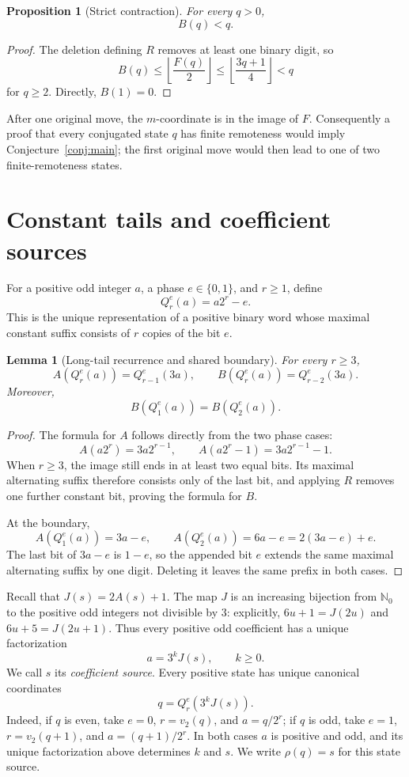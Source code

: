 \documentclass[11pt,a4paper]{article}
\newtheorem{proposition}[theorem]{Proposition}
\newtheorem{lemma}[theorem]{Lemma}
\theoremstyle{definition}
\theoremstyle{remark}
\newcommand{\Natz}{\mathbb N_0}
\begin{document}
\begin{proposition}[Strict contraction]\label{prop:B-contracts}
For every $q>0$,
\[
  B(q)<q.
\]
\end{proposition}

\begin{proof}
The deletion defining $R$ removes at least one binary digit, so
\[
 B(q)\le \left\lfloor\frac{F(q)}2\right\rfloor
 \le \left\lfloor\frac{3q+1}{4}\right\rfloor<q
\]
for $q\ge2$.  Directly, $B(1)=0$.
\end{proof}

After one original move, the $m$-coordinate is in the image of $F$.
Consequently a proof that every conjugated state $q$ has finite remoteness
would imply Conjecture~\ref{conj:main}; the first original move would then
lead to one of two finite-remoteness states.

\section{Constant tails and coefficient sources}

For a positive odd integer $a$, a phase $e\in\{0,1\}$, and $r\ge1$, define
\[
  Q_r^e(a)=a2^r-e.
\]
This is the unique representation of a positive binary word whose maximal
constant suffix consists of $r$ copies of the bit $e$.

\begin{lemma}[Long-tail recurrence and shared boundary]\label{lem:long-tail}
For every $r\ge3$,
\[
 A(Q_r^e(a))=Q_{r-1}^e(3a),
 \qquad
 B(Q_r^e(a))=Q_{r-2}^e(3a).
\]
Moreover,
\[
 B(Q_1^e(a))=B(Q_2^e(a)).
\]
\end{lemma}

\begin{proof}
The formula for $A$ follows directly from the two phase cases:
\[
 A(a2^r)=3a2^{r-1},
 \qquad
 A(a2^r-1)=3a2^{r-1}-1.
\]
When $r\ge3$, the image still ends in at least two equal bits.  Its maximal
alternating suffix therefore consists only of the last bit, and applying
$R$ removes one further constant bit, proving the formula for $B$.

At the boundary,
\[
 A(Q_1^e(a))=3a-e,
 \qquad
 A(Q_2^e(a))=6a-e=2(3a-e)+e.
\]
The last bit of $3a-e$ is $1-e$, so the appended bit $e$ extends the same
maximal alternating suffix by one digit.  Deleting it leaves the same
prefix in both cases.
\end{proof}

Recall that $J(s)=2A(s)+1$.  The map $J$ is an increasing bijection
from $\Natz$ to the positive odd integers not divisible by $3$: explicitly,
$6u+1=J(2u)$ and $6u+5=J(2u+1)$.  Thus every positive odd coefficient has a
unique factorization
\[
  a=3^k J(s),\qquad k\ge0.
\]
We call $s$ its \emph{coefficient source}.  Every positive state has unique
canonical coordinates
\[
 q=Q_r^e(3^k J(s)).
\]
Indeed, if $q$ is even, take $e=0$, $r=v_2(q)$, and $a=q/2^r$; if $q$ is
odd, take $e=1$, $r=v_2(q+1)$, and $a=(q+1)/2^r$.  In both cases $a$ is
positive and odd, and its unique factorization above determines $k$ and
$s$.  We write $\rho(q)=s$ for this state source.
\end{document}
